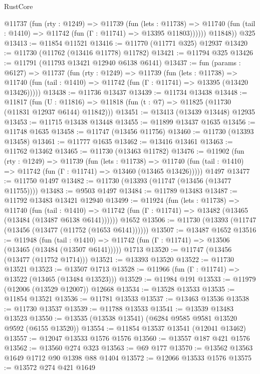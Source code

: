 \begin{lexlean}{RustCore}
\begin{coremodule}
          @11737
            (fun (rty : @1249) =>
            @11739
              (fun (lets : @11738) =>
              @11740 (fun (tail : @1410) => @11742 (fun (Γ : @11741) => @13395 @11803))))))
        @11848))
    @325
@13413 := @11854 @11521
@13416 := @11770 (@11771 @325) @12937
@13420 := @11730 (@11762 (@13416 @11778) @11782)
@13421 := @11794 @325
@13426 := @11791 (@11793 @13421 @12940 @6138 @6141)
@13437 := fun (params : @6127) =>
  @11737
    (fun (rty : @1249) =>
    @11739
      (fun (lets : @11738) =>
      @11740 (fun (tail : @1410) => @11742 (fun (Γ : @11741) => @13395 (@13420 @13426)))))
@13438 := @11736 @13437
@13439 := @11734 @13438
@13448 := @11817
    (fun (U : @11816) => @11818 (fun (t : @7) => @11825 (@11730 (@11831 @12937 @6144) @11842)))
@13451 := @13413 (@13439 @13448) @12935
@13453 := @11715 @13438 @13448
@13455 := @11899 @13437 @1635
@13456 := @11748 @1635
@13458 := @11747 (@13456 @11756)
@13460 := @11730 (@13393 @13458)
@13461 := @11777 @1635
@13462 := @13416 @13461
@13463 := @11762 @13462
@13465 := @11730 (@13463 @11782)
@13476 := @11902
    (fun (rty : @1249) =>
    @11739
      (fun (lets : @11738) =>
      @11740 (fun (tail : @1410) => @11742 (fun (Γ : @11741) => @13460 (@13465 @13426)))))
    @1497
@13477 := @11750 @1497
@13482 := @11730 (@13393 (@11747 (@13456 (@13477 @11755))))
@13483 := @9503 @1497
@13484 := @11789 @13483
@13487 := @11792 @13483 @13421 @12940
@13499 := @11924
    (fun (lets : @11738) =>
    @11740
      (fun (tail : @1410) =>
      @11742 (fun (Γ : @11741) => @13482 (@13465 (@13484 (@13487 @6138 @6141))))))
    @1652
@13506 := @11730 (@13393 (@11747 (@13456 (@13477 (@11752 (@1653 @6141))))))
@13507 := @13487 @1652
@13516 := @11948
    (fun (tail : @1410) => @11742 (fun (Γ : @11741) => @13506 (@13465 (@13484 (@13507 @6141)))))
    @1713
@13520 := @11747 (@13456 (@13477 (@11752 @1714)))
@13521 := @13393 @13520
@13522 := @11730 @13521
@13523 := @13507 @1713
@13528 := @11966 (fun (Γ : @11741) => @13522 (@13465 (@13484 @13523)))
@13529 := @11984 @191
@13533 := @11979 (@12006 (@13529 @12007)) @12668
@13534 := @13528 @13533
@13535 := @11854 @13521
@13536 := @11781 @13533
@13537 := @13463 @13536
@13538 := @11730 @13537
@13539 := @11788 @13533
@13541 := @13539 @13483 @13523
@13550 := @13535 (@13538 @13541) (@6284 @9585 @9581 @13520 @9592 (@6155 @13520))
@13554 := @11854 @13537 @13541 (@12041 @13462)
@13557 := @12047 @13533 @1576 @1576
@13560 := @13557 @187 @421 @1576
@13562 := @13560 @274 @323
@13563 := @69 @177
@13570 := @13562 @13563 @1649 @1712 @90 @1398 @88 @1404
@13572 := @12066 @13533 @1576
@13575 := @13572 @274 @421 @1649

\end{coremodule}
\end{lexlean}
